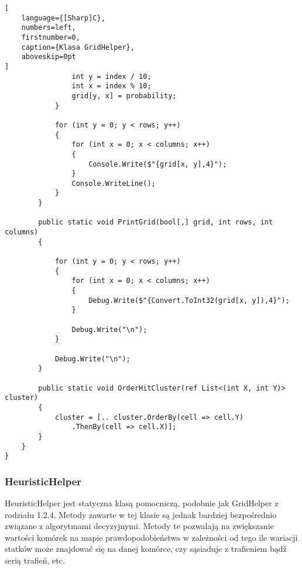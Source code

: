 \begin{addmargin}[0mm]{0mm}
\begin{lstlisting}[
    language={[Sharp]C},
    numbers=left,
    firstnumber=0,
    caption={Klasa GridHelper},
    aboveskip=0pt
]
                int y = index / 10;
                int x = index % 10;
                grid[y, x] = probability;
            }

            for (int y = 0; y < rows; y++)
            {
                for (int x = 0; x < columns; x++)
                {
                    Console.Write($"{grid[x, y],4}");
                }
                Console.WriteLine();
            }
        }

        public static void PrintGrid(bool[,] grid, int rows, int columns)
        {

            for (int y = 0; y < rows; y++)
            {
                for (int x = 0; x < columns; x++)
                {
                    Debug.Write($"{Convert.ToInt32(grid[x, y]),4}");
                }

                Debug.Write("\n");
            }

            Debug.Write("\n");
        }

        public static void OrderHitCluster(ref List<(int X, int Y)> cluster)
        {
            cluster = [.. cluster.OrderBy(cell => cell.Y)
                .ThenBy(cell => cell.X)];
        }
    }
}

\end{lstlisting}
\end{addmargin}





\subsubsection{HeuristicHelper}

HeuristicHelper jest statyczna klasą pomocniczą, podobnie jak GridHelper z rodziału 1.2.4. Metody zawarte w tej klasie są jednak bardziej bezpośrednio związane z algorytmami decyzyjnymi. Metody te pozwalają na zwiększanie wartości komórek na mapie prawdopodobieństwa w zależności od tego ile wariacji statków może znajdować się na danej komórce, czy sąsiaduje z trafieniem bądź serią trafień, etc.

